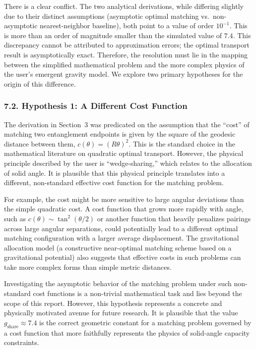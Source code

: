 \documentclass[11pt]{article}
\begin{document}
There is a clear conflict. The two analytical derivations, while differing slightly due to their distinct assumptions (asymptotic optimal matching vs.\ non-asymptotic nearest-neighbor baseline), both point to a value of order $10^{-1}$. This is more than an order of magnitude smaller than the simulated value of $7.4$. This discrepancy cannot be attributed to approximation errors; the optimal transport result is asymptotically exact. Therefore, the resolution must lie in the mapping between the simplified mathematical problem and the more complex physics of the user’s emergent gravity model. We explore two primary hypotheses for the origin of this difference.

\subsubsection*{7.2. Hypothesis 1: A Different Cost Function}
The derivation in Section~3 was predicated on the assumption that the “cost” of matching two entanglement endpoints is given by the square of the geodesic distance between them, $c(\theta) = (R\theta)^2$. This is the standard choice in the mathematical literature on quadratic optimal transport. However, the physical principle described by the user is “wedge-sharing,” which relates to the allocation of solid angle. It is plausible that this physical principle translates into a different, non-standard effective cost function for the matching problem.

For example, the cost might be more sensitive to large angular deviations than the simple quadratic cost. A cost function that grows more rapidly with angle, such as $c(\theta) \sim \tan^2(\theta/2)$ or another function that heavily penalizes pairings across large angular separations, could potentially lead to a different optimal matching configuration with a larger average displacement. The gravitational allocation model (a constructive near-optimal matching scheme based on a gravitational potential) also suggests that effective costs in such problems can take more complex forms than simple metric distances.

Investigating the asymptotic behavior of the matching problem under such non-standard cost functions is a non-trivial mathematical task and lies beyond the scope of this report. However, this hypothesis represents a concrete and physically motivated avenue for future research. It is plausible that the value $g_{\mathrm{share}} \approx 7.4$ is the correct geometric constant for a matching problem governed by a cost function that more faithfully represents the physics of solid-angle capacity constraints.
\end{document}
